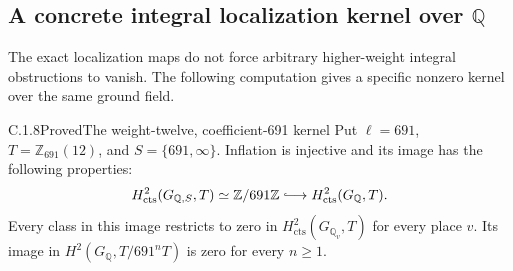 \subsection{A concrete integral localization kernel over \texorpdfstring{\(\mathbb Q\)}{Q}}
\label{sec:ghost-h2-kernel}

The exact localization maps do not force arbitrary higher-weight
integral obstructions to vanish. The following computation gives
a specific nonzero kernel over the same ground field.

\begin{result}{C.1.8}{Proved}{The weight-twelve, coefficient-691 kernel}
\label{prop:ghost-h2-691}
Put \(\ell=691\), \(T=\mathbb Z_{691}(12)\), and
\(S=\{691,\infty\}\). Inflation is injective and its image
has the following properties:
\[
 H^2_{\mathrm{cts}}(G_{\mathbb Q,S},T)
       \simeq\mathbb Z/691\mathbb Z
       \lhook\joinrel\longrightarrow H^2_{\mathrm{cts}}(G_{\mathbb Q},T).
\]
Every class in this image restricts to zero in
\(H^2_{\mathrm{cts}}(G_{\mathbb Q_v},T)\) for every place
\(v\). Its image in \(H^2(G_{\mathbb Q},T/691^nT)\) is zero
for every \(n\geq1\).
\end{result}
